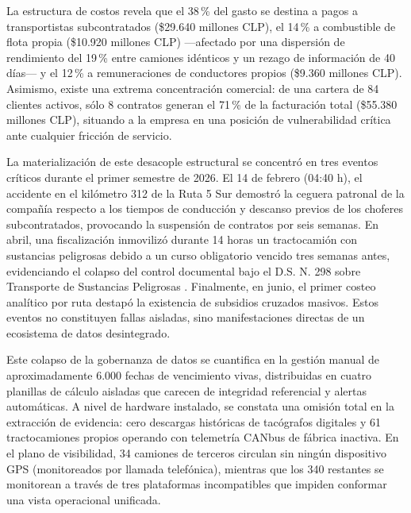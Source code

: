 La estructura de costos revela que el 38\,\% del gasto se destina a pagos a transportistas subcontratados (\$29.640 millones CLP), el 14\,\% a combustible de flota propia (\$10.920 millones CLP) ---afectado por una dispersión de rendimiento del 19\,\% entre camiones idénticos y un rezago de información de 40 días--- y el 12\,\% a remuneraciones de conductores propios (\$9.360 millones CLP). Asimismo, existe una extrema concentración comercial: de una cartera de 84 clientes activos, sólo 8 contratos generan el 71\,\% de la facturación total (\$55.380 millones CLP), situando a la empresa en una posición de vulnerabilidad crítica ante cualquier fricción de servicio.

La materialización de este desacople estructural se concentró en tres eventos críticos durante el primer semestre de 2026. El 14 de febrero (04:40 h), el accidente en el kilómetro 312 de la Ruta 5 Sur demostró la ceguera patronal de la compañía respecto a los tiempos de conducción y descanso previos de los choferes subcontratados, provocando la suspensión de contratos por seis semanas. En abril, una fiscalización inmovilizó durante 14 horas un tractocamión con sustancias peligrosas debido a un curso obligatorio vencido tres semanas antes, evidenciando el colapso del control documental bajo el D.S. N.\textordmasculine{} 298 sobre Transporte de Sustancias Peligrosas \parencite{ds298}. Finalmente, en junio, el primer costeo analítico por ruta destapó la existencia de subsidios cruzados masivos. Estos eventos no constituyen fallas aisladas, sino manifestaciones directas de un ecosistema de datos desintegrado.

Este colapso de la gobernanza de datos se cuantifica en la gestión manual de aproximadamente 6.000 fechas de vencimiento vivas, distribuidas en cuatro planillas de cálculo aisladas que carecen de integridad referencial y alertas automáticas. A nivel de hardware instalado, se constata una omisión total en la extracción de evidencia: cero descargas históricas de tacógrafos digitales y 61 tractocamiones propios operando con telemetría CANbus de fábrica inactiva. En el plano de visibilidad, 34 camiones de terceros circulan sin ningún dispositivo GPS (monitoreados por llamada telefónica), mientras que los 340 restantes se monitorean a través de tres plataformas incompatibles que impiden conformar una vista operacional unificada.

